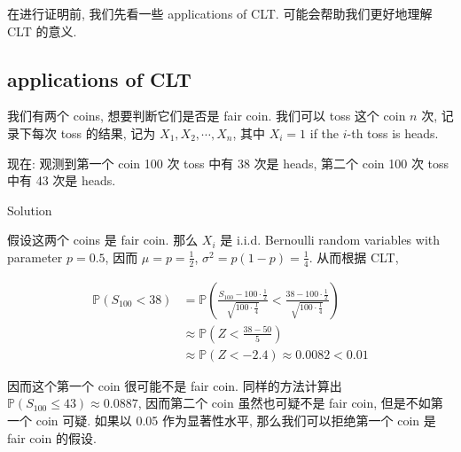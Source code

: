 在进行证明前, 我们先看一些 applications of CLT. 可能会帮助我们更好地理解 CLT 的意义.

\subsection{applications of CLT}\label{applications-of-clt}

\begin{example}

我们有两个 coins, 想要判断它们是否是 fair coin. 我们可以 toss 这个 coin \(\mathit{n}\) 次, 记录下每次 toss 的结果, 记为 \(\mathit{X}_{1},\mathit{X}_{2},\cdots,\mathit{X}_{\mathit{n}}\), 其中 \(\mathit{X}_{\mathit{i}} = 1\) if the \(\mathit{i}\)-th toss is heads.

现在: 观测到第一个 coin 100 次 toss 中有 38 次是 heads, 第二个 coin 100 次 toss 中有 43 次是 heads.

\begin{qlsolution}{Solution}

假设这两个 coins 是 fair coin. 那么 \(\mathit{X}_{\mathit{i}}\) 是 i.i.d. Bernoulli random variables with parameter \(\mathit{p} = 0.5\), 因而 \(\mathit{\mu} = \mathit{p} = \frac{1}{2}\), \(\mathit{\sigma}^{2} = \mathit{p}(1 - \mathit{p}) = \frac{1}{4}\). 从而根据 CLT,

\[\begin{aligned}
\mathbb{P}(\mathit{S}_{100} < 38) &= \mathbb{P}\left( {\frac{\mathit{S}_{100} - 100 \cdot \frac{1}{2}}{\sqrt{100 \cdot \frac{1}{4}}} < \frac{38 - 100 \cdot \frac{1}{2}}{\sqrt{100 \cdot \frac{1}{4}}}} \right) \\
 &\approx \mathbb{P}\left( {\mathit{Z} < \frac{38 - 50}{5}} \right) \\
 &\approx \mathbb{P}(\mathit{Z} < - 2.4) \approx 0.0082 < 0.01
\end{aligned}\]

因而这个第一个 coin 很可能不是 fair coin. 同样的方法计算出 \(\mathbb{P}\left( {\mathit{S}_{100} \leq 43} \right) \approx 0.0887\), 因而第二个 coin 虽然也可疑不是 fair coin, 但是不如第一个 coin 可疑. 如果以 0.05 作为显著性水平, 那么我们可以拒绝第一个 coin 是 fair coin 的假设.\\

\end{qlsolution}

\end{example}

